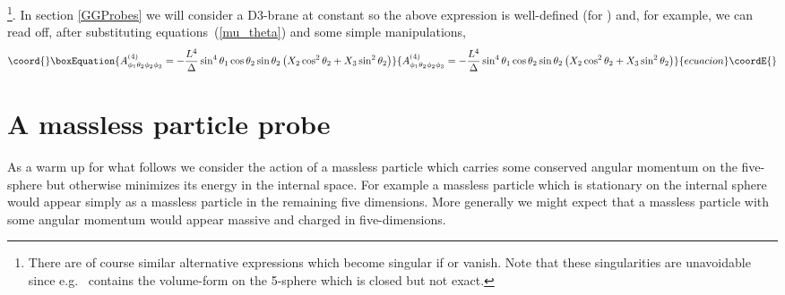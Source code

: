 \documentclass[a4paper,12pt]{article}
\begin{document}
\footnote{There are of course similar alternative expressions which become
singular if \coordHE{} or \coordHE{} vanish. Note that these singularities are
unavoidable since e.g.\ \coordHE{} contains the volume-form
on the 5-sphere which is closed but not exact.}.
In section \ref{GGProbes} we will consider a D3-brane at constant
\coordHE{} so the above expression is well-defined
(for \coordHE{}) and, for example, we can read off, after
substituting equations~(\ref{mu_theta}) and some simple manipulations,
\begin{equation}\coord{}\boxEquation{
A^{(4)}_{\phi_1\theta_2\phi_2\phi_3} =
- \frac{L^4}{\Delta} \sin^4 \theta_1 \cos \theta_2 \sin \theta_2 
\left( X_2 \cos ^2 \theta_2 +  X_3 \sin^2 \theta_2 \right)
}{
A^{(4)}_{\phi_1\theta_2\phi_2\phi_3} =
- \frac{L^4}{\Delta} \sin^4 \theta_1 \cos \theta_2 \sin \theta_2 
\left( X_2 \cos ^2 \theta_2 +  X_3 \sin^2 \theta_2 \right)
}{ecuacion}\coordE{}\end{equation}

\section{A massless particle probe}

As a warm up for what follows we consider the action of a massless particle which carries some conserved angular momentum on the five-sphere but otherwise minimizes its energy in the internal space. For example a massless particle which is stationary on the internal sphere would appear simply as a massless particle in the remaining five dimensions. More generally we might expect that a massless particle with some angular momentum would appear massive and charged in five-dimensions.
\end{document}

